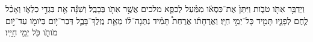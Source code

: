 \documentclass{openreader}
\begin{document}
וַיְדַבֵּ֥ר אִתֹּ֖ו טֹבֹ֑ות וַיִּתֵּן֙ אֶת־כִּסְאֹ֔ו מִמַּ֗עַל לְכִסֵּ֧א מלכים אֲשֶׁ֥ר אִתֹּ֖ו בְּבָבֶֽל׃ 
וְשִׁנָּ֕ה אֵ֖ת בִּגְדֵ֣י כִלְאֹ֑ו וְאָכַ֨ל לֶ֧חֶם לְפָנָ֛יו תָּמִ֖יד כָּל־יְמֵ֥י חַיָּֽו׃ 
וַאֲרֻחָתֹ֗ו אֲרֻחַת֩ תָּמִ֨יד נִתְּנָה־לֹּ֜ו מֵאֵ֧ת מֶֽלֶךְ־בָּבֶ֛ל דְּבַר־יֹ֥ום בְּיֹומֹ֖ו עַד־יֹ֣ום מֹותֹ֑ו כֹּ֖ל יְמֵ֥י חַיָּֽיו׃ 
\end{document}
